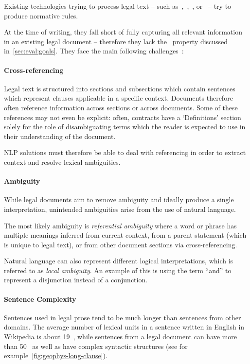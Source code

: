 Existing technologies trying to process legal text -- such as~\cite{angeli2015NLP1},~\cite{lapata2016NLP2},~\cite{lapata2018NLP3}, or~\cite{sleimi2018NLP4} -- try to produce normative rules.

At the time of writing, they fall short of fully capturing all relevant information in an existing legal document -- therefore they lack the~ property discussed in~\autoref{sec:eval:goals}.
They face the main following challenges~\cite{ferraroLegalNLPSSurvey}:

\paragraph{Cross-referencing}

Legal text is structured into sections and subsections which contain sentences which represent clauses applicable in a specific context.
Documents therefore often reference information across sections or across documents.
Some of these references may not even be explicit: often, contracts have a `Definitions' section solely for the role of disambiguating terms which the reader is expected to use in their understanding of the document.

NLP solutions must therefore be able to deal with referencing in order to extract context and resolve lexical ambiguities.

\paragraph{Ambiguity}
While legal documents aim to remove ambiguity and ideally produce a single interpretation, unintended ambiguities arise from the use of natural language.

The most likely ambiguity is \emph{referential ambiguity} where a word or phrase has multiple meanings inferred from current context, from a parent statement (which is unique to legal text), or from other document sections via cross-referencing.

Natural language can also represent different logical interpretations, which is referred to as \emph{local ambiguity}.
An example of this is using the term ``and'' to represent a disjunction instead of a conjunction.

\paragraph{Sentence Complexity}

Sentences used in legal prose tend to be much longer than sentences from other domains.
The average number of lexical units in a sentence written in English in Wikipedia is about 19~\cite{wiki19words}, while sentences from a legal document can have more than 50~\cite{ferraroLegalNLPSSurvey} as well as have complex syntactic structures (see for example~\autoref{fig:geophys-long-clause}).

